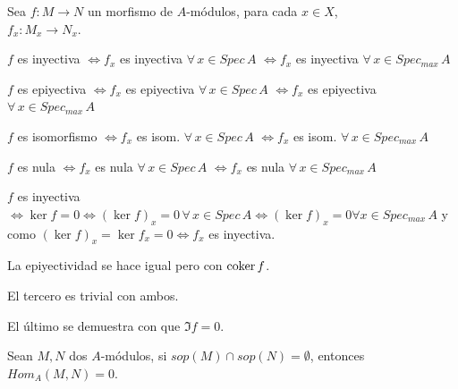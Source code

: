 \begin{cor}
    Sea $f: M \longrightarrow N$ un morfismo de $A$-m\'odulos, para cada $x \in X$, \\ $f_x : M_x \longrightarrow N_x$.
\begin{center}
    
    $f$ es inyectiva $\iff f_x$ es inyectiva $\forall \, x \in Spec\, A$ $\iff f_x$ es inyectiva $\forall \, x \in Spec_{max}\, A$

    $f$ es epiyectiva $\iff f_x$ es epiyectiva $\forall \, x \in Spec\, A$ $\iff f_x$ es epiyectiva $\forall \, x \in Spec_{max}\, A$

     $f$ es isomorfismo $\iff f_x$ es isom. $\forall \, x \in Spec\, A$ $\iff f_x$ es isom. $\forall \, x \in Spec_{max}\, A$

     $f$ es nula $\iff f_x$ es nula $\forall \, x \in Spec\, A$ $\iff f_x$ es nula $\forall \, x \in Spec_{max}\, A$
     
\end{center}
\end{cor}
\begin{dem}
    $f$ es inyectiva $\iff \ker  f=0 \iff (\ker  f)_x = 0 \, \forall \, x \in Spec\, A \iff(\ker  f)_x = 0 \forall x \in Spec_{max}\, A $ y como $(\ker  f)_x=\ker  f_x = 0 \iff f_x$ es inyectiva.

    La epiyectividad se hace igual pero con $\operatorname{coker} f$.

    El tercero es trivial con ambos.

    El \'ultimo se demuestra con que $\Im f=0$. 
\end{dem}
\begin{ejer}
    Sean $M, N$ dos $A$-m\'odulos, si $sop(M) \cap sop(N) = \emptyset$, entonces \\$Hom_A(M,N) = 0$.
\end{ejer}
